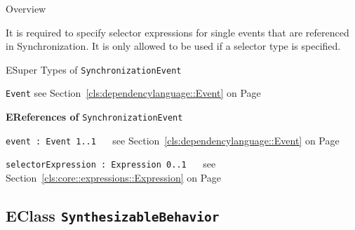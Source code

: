 	\begin{longdescription}
		\item[Overview] 		
				

	

		It is required to specify selector expressions for single events that are referenced in Synchronization.
It is only allowed to be used if a selector type is specified.
	
		\item[ESuper Types of \texttt{SynchronizationEvent}] ~
			\begin{longdescription}
				\item[\texttt{Event}] see Section~\ref{cls:dependencylanguage::Event} on Page~\pageref{cls:dependencylanguage::Event}						\end{longdescription}
		
	
			\item[\textbf{EReferences of} \texttt{SynchronizationEvent}] ~
			\begin{longdescription}
	\item[\texttt{event : Event \symbol{"5B}1..1\symbol{"5D}
}] ~
	see Section~\ref{cls:dependencylanguage::Event} on Page~\pageref{cls:dependencylanguage::Event}
	
	\nopagebreak
		
				

	

	
	\item[\texttt{selectorExpression : Expression \symbol{"5B}0..1\symbol{"5D}
}] ~
	see Section~\ref{cls:core::expressions::Expression} on Page~\pageref{cls:core::expressions::Expression}
	
	\nopagebreak
		
				

	

	
			\end{longdescription}
	
	\end{longdescription}
	

\subsection{EClass \bfseries \texttt{SynthesizableBehavior}\normalfont}
\label{cls:dependencylanguage::SynthesizableBehavior} 
	
